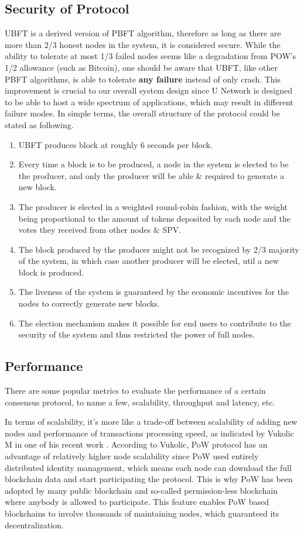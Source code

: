 \subsection{Security of Protocol}
    UBFT is a derived version of PBFT algorithm, therefore as long as there are more than 2/3 honest nodes in the system, it is considered secure. While the ability to tolerate at most 1/3 failed nodes seems like a degradation from POW's 1/2 allowance (such as Bitcoin), one should be aware that UBFT, like other PBFT algorithms, is able to tolerate \textbf{any failure} instead of only crash. This improvement is crucial to our overall system design since U Network is designed to be able to host a wide spectrum of applications, which may result in different failure modes.
    In simple terms, the overall structure of the protocol could be stated as following.
\begin{enumerate}
    \item  UBFT produces block at roughly 6 seconds per block.
    \item  Every time a block is to be produced, a node in the system is elected to be the producer, and only the producer will be able \& required to generate a new block.
    \item  The producer is elected in a weighted round-robin fashion, with the weight being proportional to the amount of tokens deposited by each node and the votes they received from other nodes \& SPV.
    \item  The block produced by the producer might not be recognized by 2/3 majority of the system, in which case another producer will be elected, util a new block is produced.
    \item  The liveness of the system is guaranteed by the economic incentives for the nodes to correctly generate new blocks.
    \item  The election mechanism makes it possible for end users to contribute to the security of the system and thus restricted the power of full nodes.
\end{enumerate}

\subsection{Performance}

There are some popular metrics to evaluate the performance of a certain consensus protocol, to name a few, scalability, throughput and latency, etc.

In terms of scalability, it's more like a trade-off between scalability of adding new nodes and performance of transactions processing speed, as indicated by Vukolic M in one of his recent work \cite{bft_perf}. According to Vukolic, PoW protocol has an advantage of relatively higher node scalability since PoW used entirely distributed identity management, which means each node can download the full blockchain data and start participating the protocol. This is why PoW has been adopted by many public blockchain and so-called permission-less blockchain where anybody is allowed to participate. This feature enables PoW based blockchains to involve thousands of maintaining nodes, which guaranteed its decentralization. 


